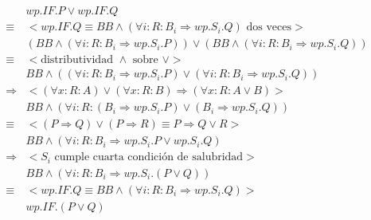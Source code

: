 \documentclass{article}
\begin{document}
\begin{align*}
 & wp.IF.P \vee wp.IF.Q \\
 \equiv & <wp.IF.Q \equiv BB \wedge (\forall i : R : B_i \Rightarrow wp.S_i.Q) \text{ dos veces}> \\
 & (BB \wedge (\forall i : R : B_i \Rightarrow wp.S_i.P)) \vee (BB \wedge (\forall i : R : B_i \Rightarrow wp.S_i.Q)) \\
 \equiv & <\text{distributividad } \wedge \text{ sobre } \vee> \\
 & BB \wedge ((\forall i : R : B_i \Rightarrow wp.S_i.P) \vee (\forall i : R : B_i \Rightarrow wp.S_i.Q)) \\
 \Rightarrow & <(\forall x : R : A) \vee (\forall x : R : B) \Rightarrow (\forall x : R : A \vee B)> \\
 & BB \wedge (\forall i : R : (B_i \Rightarrow wp.S_i.P) \vee (B_i \Rightarrow wp.S_i.Q)) \\
 \equiv & <(P \Rightarrow Q) \vee (P \Rightarrow R) \equiv P \Rightarrow Q \vee R> \\
 & BB \wedge (\forall i : R : B_i \Rightarrow wp.S_i.P \vee wp.S_i.Q) \\
 \Rightarrow & <S_i \text{ cumple cuarta condición de salubridad}> \\
 & BB \wedge (\forall i : R : B_i \Rightarrow wp.S_i.(P \vee Q)) \\
 \equiv & <wp.IF.Q \equiv BB \wedge (\forall i : R : B_i \Rightarrow wp.S_i.Q)> \\
 & wp.IF.(P \vee Q)
\end{align*}

\section{}
\end{document}
